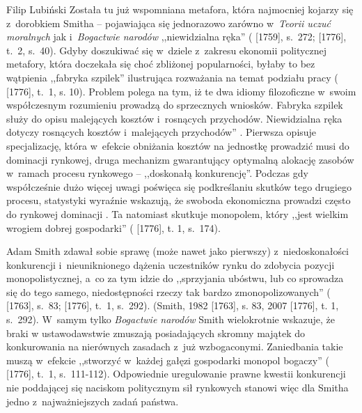 \begin{artplenv}{Filip Lubiński}
Została tu już wspomniana metafora, która najmocniej kojarzy się z~dorobkiem Smitha -- pojawiająca się jednorazowo
zarówno w~\textit{Teorii uczuć moralnych} jak i~\textit{Bogactwie narodów} ,,niewidzialna ręka''
(\cite{smith_teoria_1989} [1759], s.~272; \cite*{smith_badania_2007} [1776], t.~2, s.~40).
Gdyby doszukiwać
się w~dziele z~zakresu ekonomii politycznej metafory, która doczekała się choć zbliżonej popularności,
byłaby to bez wątpienia
,,fabryka szpilek'' ilustrująca rozważania na temat podziału pracy
(\cite{smith_badania_2007} [1776], t.~1, s. 10).
Problem polega na tym, iż te dwa idiomy filozoficzne w~swoim współczesnym rozumieniu prowadzą do sprzecznych
wniosków. Fabryka szpilek służy do opisu malejących kosztów i~rosnących przychodów. Niewidzialna ręka dotyczy rosnących
kosztów i~malejących przychodów''
\parencite[s.~47]{warsh_wiedza_2012}.
Pierwsza opisuje specjalizację,
która w~efekcie obniżania kosztów na jednostkę prowadzić musi do dominacji rynkowej, druga mechanizm gwarantujący optymalną
alokację zasobów w~ramach procesu rynkowego -- ,,doskonałą konkurencję''. Podczas gdy współcześnie dużo więcej uwagi
poświęca się podkreślaniu skutków tego drugiego procesu, statystyki wyraźnie wskazują, że swoboda ekonomiczna prowadzi
często do rynkowej dominacji
\parencite[s.~125–126]{keen_debunking_2011}.
Ta natomiast skutkuje monopolem, który
,,jest wielkim wrogiem dobrej gospodarki''
(\cite{smith_badania_2007} [1776], t. 1, s.~174).

 Adam Smith zdawał sobie sprawę (może nawet jako pierwszy) z~niedoskonałości konkurencji i~nieuniknionego dążenia
uczestników rynku do zdobycia pozycji monopolistycznej, a~co za tym idzie do ,,sprzyjania ubóstwu, lub co sprowadza się
do tego samego, niedostępności rzeczy tak bardzo zmonopolizowanych''
(\cite{smith_lectures_1982} [1763], s.~83; \cite*{smith_badania_2007} [1776], t.~1, s.~292).
\label{ref:RNDSBDgty6ieq}(Smith, 1982 [1763], s. 83, 2007 [1776], t. 1, s.~292).
W~samym tylko \textit{Bogactwie narodów} Smith wielokrotnie wskazuje, że braki w
ustawodawstwie zmuszają posiadających skromny majątek do konkurowania na nierównych zasadach z~już wzbogaconymi.
Zaniedbania takie muszą w~efekcie ,,stworzyć w~każdej gałęzi gospodarki monopol bogaczy''
(\cite{smith_badania_2007} [1776], t.~1, s.~111-112).
Odpowiednie uregulowanie prawne kwestii konkurencji
nie poddającej się naciskom politycznym sił rynkowych stanowi więc dla Smitha jedno z~najważniejszych zadań państwa.


\end{artplenv}
